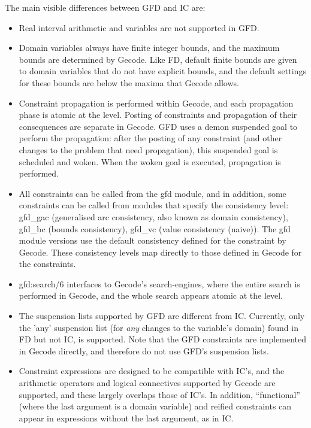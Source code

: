 The main visible differences between GFD and IC are:
\begin{itemize}
       \item Real interval arithmetic and variables are not supported in GFD.

       \item Domain variables always have finite integer bounds, and the maximum 
       bounds are
       determined by Gecode. Like FD, default finite bounds are given to 
       domain variables that do not have explicit bounds, and the default
       settings for these bounds are below the maxima that Gecode allows.

       \item Constraint propagation is performed within Gecode, and each propagation
       phase is atomic at the {\eclipse} level. Posting of constraints and 
       propagation of their consequences are separate in Gecode. GFD uses a
       demon suspended goal to perform the propagation: after the posting
       of any constraint (and other changes to the problem that need
       propagation), this suspended goal is scheduled and woken. When the
       woken goal is executed, propagation is performed. 

       \item All constraints can be called from the gfd module, and in
       addition, some constraints can be called from modules that specify
       the consistency level: gfd_gac (generalised arc consistency, also
       known as domain consistency), gfd_bc (bounds consistency), gfd_vc (value
       consistency (naive)). The gfd module versions use the 
       default consistency 
       defined for the constraint by Gecode. These consistency levels map
       directly to those defined in Gecode for the constraints.

       \item gfd:search/6 interfaces to Gecode's search-engines, where the
       entire search is performed in Gecode, and the whole search appears
       atomic at the {\eclipse} level. 

       \item The suspension lists supported by GFD are different from IC.
       Currently, only the 'any' suspension list (for {\em any} changes to the
       variable's domain) found in FD but not IC, is supported. Note that
       the GFD constraints are implemented in Gecode directly, and therefore
       do not use GFD's suspension lists. 

      \item Constraint expressions are designed to be compatible with 
      IC's, and the arithmetic operators and logical connectives supported 
      by Gecode are supported, and these largely overlaps those of IC's.
      In addition, ``functional'' (where the last argument is a domain 
      variable) and reified constraints can appear in expressions without the
      last argument, as in IC.


\end{itemize}
